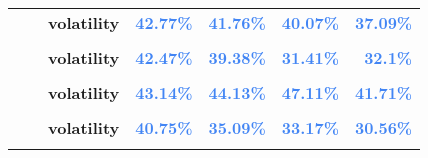 \documentclass[
  authoryear,
  preprint,
  3p]{elsarticle}
\begin{document}
\begin{longtable}[t]{>{}l>{}l>{}l>{}r>{}r>{}r>{}r}
\textbf{} & \textbf{} & \textbf{volatility} & \textcolor[HTML]{4285f4}{\textbf{42.77\%}} & \textcolor[HTML]{4285f4}{\textbf{41.76\%}} & \textcolor[HTML]{4285f4}{\textbf{40.07\%}} & \textcolor[HTML]{4285f4}{\textbf{37.09\%}}\\
\textbf{\cellcolor{gray!10}{}} & \textbf{\cellcolor{gray!10}{backwardation}} & \textbf{\cellcolor{gray!10}{mean}} & \textcolor[HTML]{4285f4}{\textbf{\cellcolor{gray!10}{39\%}}} & \textcolor[HTML]{4285f4}{\textbf{\cellcolor{gray!10}{19.82\%}}} & \textcolor[HTML]{4285f4}{\textbf{\cellcolor{gray!10}{23.98\%}}} & \textcolor[HTML]{4285f4}{\textbf{\cellcolor{gray!10}{9.69\%}}}\\
\addlinespace
\textbf{} & \textbf{} & \textbf{volatility} & \textcolor[HTML]{4285f4}{\textbf{42.47\%}} & \textcolor[HTML]{4285f4}{\textbf{39.38\%}} & \textcolor[HTML]{4285f4}{\textbf{31.41\%}} & \textcolor[HTML]{4285f4}{\textbf{32.1\%}}\\
\textbf{\cellcolor{gray!10}{}} & \textbf{\cellcolor{gray!10}{contango}} & \textbf{\cellcolor{gray!10}{mean}} & \textcolor[HTML]{4285f4}{\textbf{\cellcolor{gray!10}{-5.22\%}}} & \textcolor[HTML]{4285f4}{\textbf{\cellcolor{gray!10}{42.13\%}}} & \textcolor[HTML]{4285f4}{\textbf{\cellcolor{gray!10}{-0.09\%}}} & \textcolor[HTML]{4285f4}{\textbf{\cellcolor{gray!10}{-19.47\%}}}\\
\textbf{} & \textbf{} & \textbf{volatility} & \textcolor[HTML]{4285f4}{\textbf{43.14\%}} & \textcolor[HTML]{4285f4}{\textbf{44.13\%}} & \textcolor[HTML]{4285f4}{\textbf{47.11\%}} & \textcolor[HTML]{4285f4}{\textbf{41.71\%}}\\
\textbf{\cellcolor{gray!10}{Heating oil (XNYM)}} & \textbf{\cellcolor{gray!10}{whole period}} & \textbf{\cellcolor{gray!10}{mean}} & \textcolor[HTML]{4285f4}{\textbf{\cellcolor{gray!10}{16.31\%}}} & \textcolor[HTML]{4285f4}{\textbf{\cellcolor{gray!10}{*29.88\%}}} & \textcolor[HTML]{4285f4}{\textbf{\cellcolor{gray!10}{6.83\%}}} & \textcolor[HTML]{4285f4}{\textbf{\cellcolor{gray!10}{-3.44\%}}}\\
\textbf{} & \textbf{} & \textbf{volatility} & \textcolor[HTML]{4285f4}{\textbf{40.75\%}} & \textcolor[HTML]{4285f4}{\textbf{35.09\%}} & \textcolor[HTML]{4285f4}{\textbf{33.17\%}} & \textcolor[HTML]{4285f4}{\textbf{30.56\%}}\\
\addlinespace
\textbf{\cellcolor{gray!10}{}} & \textbf{\cellcolor{gray!10}{backwardation}} & \textbf{\cellcolor{gray!10}{mean}} & \textcolor[HTML]{4285f4}{\textbf{\cellcolor{gray!10}{36.32\%}}} & \textcolor[HTML]{4285f4}{\textbf{\cellcolor{gray!10}{29.41\%}}} & \textcolor[HTML]{4285f4}{\textbf{\cellcolor{gray!10}{25.56\%}}} & \textcolor[HTML]{4285f4}{\textbf{\cellcolor{gray!10}{15.16\%}}}\\

\end{longtable}
\end{document}
